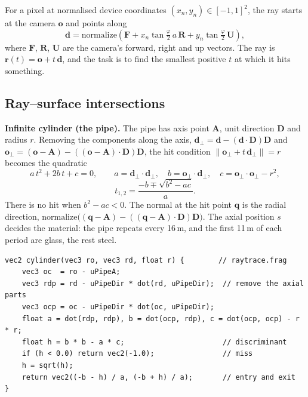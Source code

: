 \documentclass[11pt,a4paper]{report}
\newcommand{\vect}[1]{\mathbf{#1}}
\begin{document}
For a pixel at normalised device coordinates $(x_n, y_n)\in[-1,1]^2$, the ray starts
at the camera $\vect{o}$ and points along
\begin{equation}
\vect{d} = \text{normalize}\!\left(\vect{F} + x_n\tan\tfrac{\varphi}{2}\,a\,\vect{R} + y_n\tan\tfrac{\varphi}{2}\,\vect{U}\right),
\end{equation}
where $\vect{F}$, $\vect{R}$, $\vect{U}$ are the camera's forward, right and up vectors.
The ray is $\vect{r}(t) = \vect{o} + t\,\vect{d}$, and the task is to find the smallest
positive $t$ at which it hits something.

\subsection{Ray--surface intersections}

\textbf{Infinite cylinder (the pipe).} The pipe has axis point $\vect{A}$, unit
direction $\vect{D}$ and radius $r$. Removing the components along the axis,
$\vect{d}_\perp = \vect{d} - (\vect{d}\cdot\vect{D})\vect{D}$ and
$\vect{o}_\perp = (\vect{o}-\vect{A}) - ((\vect{o}-\vect{A})\cdot\vect{D})\vect{D}$,
the hit condition $\lVert\vect{o}_\perp + t\,\vect{d}_\perp\rVert = r$ becomes the
quadratic
\begin{equation}
a\,t^2 + 2b\,t + c = 0,\qquad a = \vect{d}_\perp\cdot\vect{d}_\perp,\quad
b = \vect{o}_\perp\cdot\vect{d}_\perp,\quad c = \vect{o}_\perp\cdot\vect{o}_\perp - r^2,
\end{equation}
\begin{equation}
t_{1,2} = \frac{-b \mp \sqrt{b^2 - a c}}{a}.
\end{equation}
There is no hit when $b^2-ac<0$. The normal at the hit point $\vect{q}$ is the radial
direction, $\text{normalize}\big((\vect{q}-\vect{A}) - ((\vect{q}-\vect{A})\cdot\vect{D})\vect{D}\big)$.
The axial position $s$ decides the material: the pipe repeats every 16\,m, and the
first 11\,m of each period are glass, the rest steel.

\noindent\begin{minipage}{\linewidth}
\begin{lstlisting}
vec2 cylinder(vec3 ro, vec3 rd, float r) {        // raytrace.frag
    vec3 oc  = ro - uPipeA;
    vec3 rdp = rd - uPipeDir * dot(rd, uPipeDir);  // remove the axial parts
    vec3 ocp = oc - uPipeDir * dot(oc, uPipeDir);
    float a = dot(rdp, rdp), b = dot(ocp, rdp), c = dot(ocp, ocp) - r * r;
    float h = b * b - a * c;                       // discriminant
    if (h < 0.0) return vec2(-1.0);                // miss
    h = sqrt(h);
    return vec2((-b - h) / a, (-b + h) / a);       // entry and exit
}
\end{lstlisting}
\end{minipage}
\end{document}
